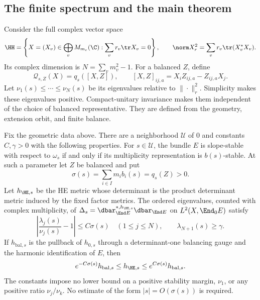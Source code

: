 \subsection{The finite spectrum and the main theorem}
Consider the full complex vector space
\begin{equation}\label{eq:finite-space}
\HH=\left\{X=(X_v)\in\bigoplus_vM_{m_v}(\C):
\sum_vr_v\tr X_v=0\right\},\qquad
\norm X_r^2=\sum_vr_v\tr(X_v^*X_v).
\end{equation}
Its complex dimension is $N=\sum_vm_v^2-1$. For a balanced $Z$, define
\begin{equation}\label{eq:finite-form}
\mathcal Q_{s,Z}(X)=q_s([X,Z]),\qquad
[X,Z]_{ij,a}=X_iZ_{ij,a}-Z_{ij,a}X_j.
\end{equation}
Let $\nu_1(s)\le\cdots\le\nu_N(s)$ be its eigenvalues relative to
$\|\cdot\|_r^2$.
Simplicity makes these eigenvalues positive. Compact-unitary invariance
makes them independent of the choice of balanced representative.
They are defined from the geometry, extension orbit, and finite balance.

\begin{theorem}\label{thm:main}
Fix the geometric data above. There are a neighborhood $\mathcal U$ of
$0$ and constants $C,\gamma>0$ with the following properties.
For $s\in\mathcal U$, the bundle $E$ is slope-stable with respect to
$\omega_s$ if and only if its multiplicity representation is
$b(s)$-stable. At such a parameter let $Z$ be balanced and put
\begin{equation}\label{eq:sigma}
\sigma(s)=\sum_{i\in I}m_ib_i(s)=q_s(Z)>0.
\end{equation}
Let $h_{\HE,s}$ be the HE metric whose determinant is the product
determinant metric induced by the fixed factor metrics. The ordered
eigenvalues, counted with complex multiplicity, of
$\Delta_s=\dbar_{\End E}^{*,h_{\HE,s}}\dbar_{\End E}$ on
$L^2(X,\End_0E)$ satisfy
\begin{equation}\label{eq:main-spectrum}
\left|\frac{\lambda_j(s)}{\nu_j(s)}-1\right|\le C\sigma(s)
\quad(1\le j\le N),\qquad \lambda_{N+1}(s)\ge\gamma.
\end{equation}
If $h_{\mathrm{bal},s}$ is the pullback of $h_{0,s}$ through a
determinant-one balancing gauge and the harmonic identification of $E$,
then
\begin{equation}\label{eq:main-metric}
e^{-C\sigma(s)}h_{\mathrm{bal},s}\le h_{\HE,s}
\le e^{C\sigma(s)}h_{\mathrm{bal},s}.
\end{equation}
The constants impose no lower bound on a positive stability margin,
$\nu_1$, or any positive ratio $\nu_j/\nu_k$. No estimate of the form
$|s|=O(\sigma(s))$ is required.
\end{theorem}


